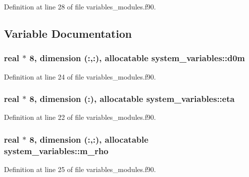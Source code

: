 Definition at line 28 of file variables\+\_\+modules.\+f90.



\subsection{Variable Documentation}
\subsubsection[{\texorpdfstring{d0m}{d0m}}]{\setlength{\rightskip}{0pt plus 5cm}real $\ast$ 8, dimension (\+:,\+:), allocatable system\+\_\+variables\+::d0m}\hypertarget{namespacesystem__variables_af9b49bbada067d17e1aa9feb7bde1237}{}\label{namespacesystem__variables_af9b49bbada067d17e1aa9feb7bde1237}


Definition at line 24 of file variables\+\_\+modules.\+f90.

\subsubsection[{\texorpdfstring{eta}{eta}}]{\setlength{\rightskip}{0pt plus 5cm}real $\ast$ 8, dimension (\+:), allocatable system\+\_\+variables\+::eta}\hypertarget{namespacesystem__variables_abace0b1eb27d0ed93f6d602742b93d64}{}\label{namespacesystem__variables_abace0b1eb27d0ed93f6d602742b93d64}


Definition at line 22 of file variables\+\_\+modules.\+f90.

\subsubsection[{\texorpdfstring{m\+\_\+rho}{m_rho}}]{\setlength{\rightskip}{0pt plus 5cm}real $\ast$ 8, dimension (\+:,\+:), allocatable system\+\_\+variables\+::m\+\_\+rho}\hypertarget{namespacesystem__variables_a29f67834297ad2a3ff687b92a32131d2}{}\label{namespacesystem__variables_a29f67834297ad2a3ff687b92a32131d2}


Definition at line 25 of file variables\+\_\+modules.\+f90.

